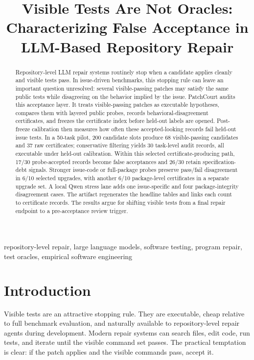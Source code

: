 \documentclass[conference]{IEEEtran}
\newcommand{\patchcourt}{PatchCourt\xspace}
\begin{document}
\title{Visible Tests Are Not Oracles: Characterizing False Acceptance in LLM-Based Repository Repair}

\author{}

\maketitle

\begin{abstract}
Repository-level LLM repair systems routinely stop when a candidate applies cleanly and visible tests pass.
In issue-driven benchmarks, this stopping rule can leave an important question unresolved: several visible-passing patches may satisfy the same public tests while disagreeing on the behavior implied by the issue.
\patchcourt audits this acceptance layer.
It treats visible-passing patches as executable hypotheses, compares them with layered public probes, records behavioral-disagreement certificates, and freezes the certificate index before held-out labels are opened.
Post-freeze calibration then measures how often these accepted-looking records fail held-out issue tests.
In a 50-task pilot, 200 candidate slots produce 68 visible-passing candidates and 37 raw certificates; conservative filtering yields 30 task-level audit records, all executable under held-out calibration.
Within this selected certificate-producing path, 17/30 probe-accepted records become false acceptances and 26/30 retain specification-debt signals.
Stronger issue-code or full-package probes preserve pass/fail disagreement in 6/10 selected upgrades, with another 6/10 package-level certificates in a separate upgrade set.
A local Qwen stress lane adds one issue-specific and four package-integrity disagreement cases.
The artifact regenerates the headline tables and links each count to certificate records.
The results argue for shifting visible tests from a final repair endpoint to a pre-acceptance review trigger.
\end{abstract}

\begin{IEEEkeywords}
repository-level repair, large language models, software testing, program repair, test oracles, empirical software engineering
\end{IEEEkeywords}
\section{Introduction}

Visible tests are an attractive stopping rule.
They are executable, cheap relative to full benchmark evaluation, and naturally available to repository-level repair agents during development.
Modern repair systems can search files, edit code, run tests, and iterate until the visible command set passes.
The practical temptation is clear: if the patch applies and the visible commands pass, accept it.
\end{document}
